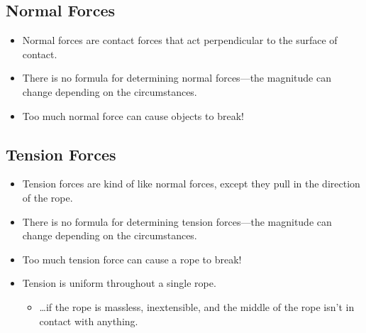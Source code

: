 \documentclass[]{article}
\begin{document}
\begin{PresentSpace}
\vspace{-10pt}
\section*{Normal Forces}
\vspace{-10pt}
\begin{itemize}
	\item Normal forces are contact forces that act perpendicular to the surface of contact.
	\item There is no formula for determining normal forces---the magnitude can change
	depending on the circumstances.
	\item Too much normal force can cause objects to break!
\end{itemize}
\end{PresentSpace}
\newpage
\begin{TeacherMargin}

\end{TeacherMargin}
\begin{PresentSpace}
\vspace{-10pt}
\section*{Tension Forces}
\vspace{-10pt}
\begin{itemize}
	\item Tension forces are kind of like normal forces, except they pull in the direction of
	the rope.
	\item There is no formula for determining tension forces---the magnitude can change depending on the circumstances.
	\item Too much tension force can cause a rope to break!
	\item Tension is uniform throughout a single rope.
	\begin{itemize}
		\normalsize
		\item \dots if the rope is massless, inextensible, and the middle of the rope isn’t in contact with anything.
	\end{itemize}
\end{itemize}
\end{PresentSpace}
\newpage
\begin{TeacherMargin}

\end{TeacherMargin}
\end{document}
